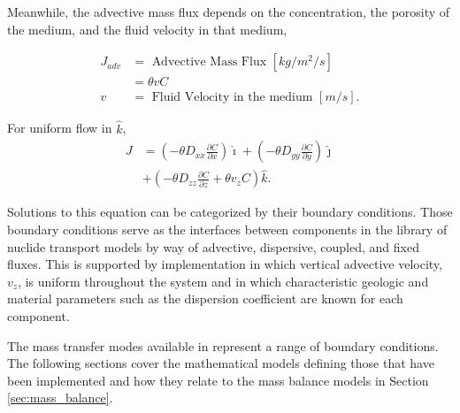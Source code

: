 Meanwhile, the advective mass flux depends on the concentration, the porosity 
of the medium, and the fluid velocity in that medium, 

    \begin{align}
      J_{adv} &= \mbox{ Advective Mass Flux }[kg/m^2/s]\nonumber\\
      &= \theta vC\nonumber\\
      v &= \mbox{ Fluid Velocity in the medium }[m/s].\nonumber
    \end{align}

For uniform flow in $\hat{k}$, 
    \begin{align}
      J &=\left(-\theta D_{xx} \frac{\partial C}{\partial x}
             \right)\hat{\imath}
             + \left( -\theta D_{yy} \frac{\partial C}{\partial y}
            \right)\hat{\jmath}\nonumber\\
            &+ \left( -\theta D_{zz} \frac{\partial C}{\partial z}
             + \theta v_zC \right)\hat{k}.
      \label{unidirflow}
    \end{align}

Solutions to this equation can be categorized by their boundary conditions.  
Those boundary conditions serve as the interfaces between components in the 
\Cyder library of nuclide transport models by way of advective, dispersive, 
coupled, and fixed fluxes.  This is supported by implementation in which 
vertical advective velocity, $v_z$, is uniform throughout the system and in which 
characteristic geologic and material parameters such as the dispersion 
coefficient are known for each component. 

The mass transfer modes available in \Cyder represent a range of boundary 
conditions. The following sections cover the mathematical models defining those 
that have been implemented and how they relate to the mass balance models in 
Section \ref{sec:mass_balance}.

